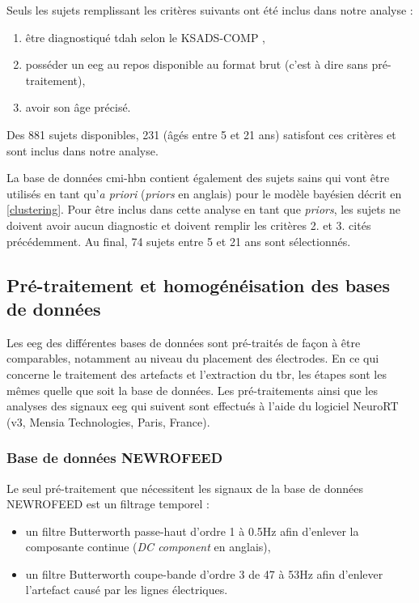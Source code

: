 Seuls les sujets remplissant les critères suivants ont été inclus dans notre analyse :
\begin{enumerate}
\item être diagnostiqué \gls{tdah} selon le KSADS-COMP \citep{Kaufman1997},
\item posséder un \gls{eeg} au repos disponible au format brut (c'est à dire sans pré-traitement),
\item avoir son âge précisé.
\end{enumerate}

Des 881 sujets disponibles, 231 (âgés entre 5 et 21 ans) satisfont ces critères et sont inclus dans notre analyse.

La base de données \gls{cmi-hbn} contient également des sujets sains qui vont être utilisés en tant qu'\textit{a priori} (\textit{priors} en anglais) pour le
modèle bayésien décrit en \ref{clustering}. Pour être inclus dans cette analyse en tant que \textit{priors}, les sujets ne doivent avoir aucun diagnostic 
et doivent remplir les critères 2. et 3. cités précédemment. Au final, 74 sujets entre 5 et 21 ans sont sélectionnés. 

\subsection{Pré-traitement et homogénéisation des bases de données} \label{pré-traitement TBR}
Les \gls{eeg} des différentes bases de données sont pré-traités de façon à être comparables, notamment au niveau du placement des électrodes.
En ce qui concerne le traitement des artefacts et l'extraction du \gls{tbr}, les étapes sont les mêmes quelle que soit la base de données. 
Les pré-traitements ainsi que les analyses des signaux \gls{eeg} qui suivent sont effectués à l'aide du logiciel NeuroRT (v3, Mensia Technologies, 
Paris, France).

\subsubsection{Base de données NEWROFEED}
Le seul pré-traitement que nécessitent les signaux de la base de données NEWROFEED est un filtrage temporel : 
\begin{itemize}
\item un filtre Butterworth passe-haut d'ordre 1 à 0.5Hz afin d'enlever la composante continue (\textit{DC component} en anglais),
\item un filtre Butterworth coupe-bande d'ordre 3 de 47 à 53Hz afin d'enlever l'artefact causé par les lignes électriques.
\end{itemize}

